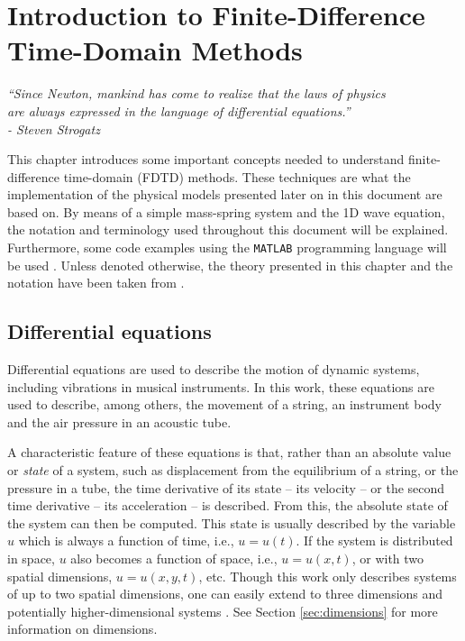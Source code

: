\chapter{Introduction to Finite-Difference Time-Domain Methods}\label{ch:FDTD}

\begin{flushright}{\it
``Since Newton, mankind has come to realize that the laws of physics\\
are always expressed in the language of differential equations.''\\
- Steven Strogatz} %
\end{flushright}
%
\vspace{2em}
This chapter introduces some important concepts needed to understand finite-difference time-domain (FDTD) methods. These techniques are what the implementation of the physical models presented later on in this document are based on. 
By means of a simple mass-spring system and the 1D wave equation, the notation and terminology used throughout this document will be explained. Furthermore, some code examples using the \texttt{MATLAB} programming language will be used \cite{MATLAB:R2020b_u5}.
Unless denoted otherwise, the theory presented in this chapter and the notation have been taken from \cite{theBible}. %

\section{Differential equations}\label{sec:differentialEquations}
Differential equations are used to describe the motion of dynamic systems, including vibrations in musical instruments. In this work, these equations are used to describe, among others, the movement of a string, an instrument body and the air pressure in an acoustic tube.

A characteristic feature of these equations is that, rather than an absolute value or \textit{state} of a system, such as displacement from the equilibrium of a string, or the pressure in a tube, the time derivative of its state -- its velocity -- or the second time derivative -- its acceleration -- is described. From this, the absolute state of the system can then be computed.
%
This state is usually described by the variable $u$ which is always a function of time, i.e., $u=u(t)$. If the system is distributed in space, $u$ also becomes a function of space, i.e., $u = u(x,t)$, or with two spatial dimensions, $u = u(x,y,t)$, etc. Though this work only describes systems of up to two spatial dimensions, one can easily extend to three dimensions \cite{Hamilton2016} and potentially higher-dimensional systems%
. See Section \ref{sec:dimensions} for more information on dimensions.

